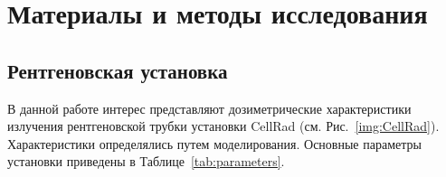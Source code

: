 %
%

\section{Материалы и методы исследования}
\label{ch:methods}

\subsection{Рентгеновская установка}

В данной работе интерес представляют дозиметрические характеристики излучения рентгеновской трубки установки CellRad (см. Рис.~\ref{img:CellRad}). Характеристики определялись путем моделирования. Основные параметры установки приведены в Таблице~\ref{tab:parameters}.

